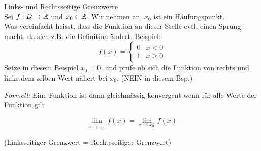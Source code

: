 \begin{definition}{Links- und Rechtsseitige Grenzwerte}\\
    Sei $f : D \to \mathbb{R}$ und $x_0 \in \mathbb{R}$. Wir nehmen an, $x_0$ ist ein Häufungspunkt.\\ Was vereinfacht heisst, dass die Funktion an dieser Stelle evtl. einen Sprung macht, da sich z.B. die Definition ändert. Beispiel:
    \begin{equation*}
            f(x) = \begin{cases}
                0 & x < 0\\
                1 & x \geq 0
            \end{cases}
        \end{equation*}
    Setze in diesem Beispiel $x_0 = 0$, und prüfe ob sich die Funktion von rechts und links dem selben Wert nähert bei $x_0$. (NEIN in diesem Bsp.)

    \emph{Formell:} Eine Funktion ist dann gleichmässig konvergent wenn für alle Werte der Funktion gilt

    $$\lim_{x \to x_0^+} f(x) = \lim_{x \to x_0^-} f(x)$$

    (Linksseitiger Grenzwert = Rechtsseitiger Grenzwert)
\end{definition}








